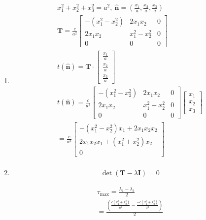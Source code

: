 \begin{problem}
\begin{enumerate}
\item 
\begin{align}
x_{1}^2+x_{2}^2+x_{3}^2=a^2, \ \hat{\mathbf{n}}=\left( \frac{x_{1}}{a}, \frac{x_{2}}{a}, \frac{x_{3}}{a} \right) \\
\mathbf{T}=\frac{c}{a^2}\begin{bmatrix}
-(x_{1}^2-x_{2}^2) & 2x_{1}x_{2} & 0 \\
2x_{1}x_{2} & x^2_{1}-x_{2}^2 & 0 \\
0 & 0 & 0
\end{bmatrix} \\
t(\mathbf{\hat{n}})=\mathbf{T}\cdot \begin{bmatrix}
\frac{x_{1}}{a} \\
\frac{x_{2}}{a} \\
\frac{x_{3}}{a}
\end{bmatrix} \\
t(\mathbf{\hat{n}})=\frac{c}{a^3}\begin{bmatrix}
-(x_{1}^2-x_{2}^2) & 2x_{1}x_{2} & 0 \\
2x_{1}x_{2} & x^2_{1}-x_{2}^2 & 0 \\
0 & 0 & 0
\end{bmatrix}\begin{bmatrix}
x_{1} \\
x_{2} \\
x_{3}
\end{bmatrix} \\
=\frac{c}{a^3}\begin{bmatrix}
-(x_{1}^2-x_{2}^2)x_{1}+2x_{1}x_{2}x_{2} \\
2x_{1}x_{2}x_{1}+(x_{1}^2+x_{2}^2)x_{2} \\
0
\end{bmatrix} \\
\end{align}

    \item 
    \begin{align}
        \det(\mathbf{T}-\lambda \mathbf{I})=0 
    \end{align}


    \begin{align}
    \tau_{\text{max}}=\frac{\lambda_{1}-\lambda_{3}}{2} \\
    =\frac{\left( \frac{c(x_{1}^2+x_{2}^2)}{a^2}-\frac{-c(x_{1}^2+x_{2}^2)}{a^2} \right)}{2} \\
    \end{align}
    
    \end{enumerate}
    
\end{problem}
\pagebreak